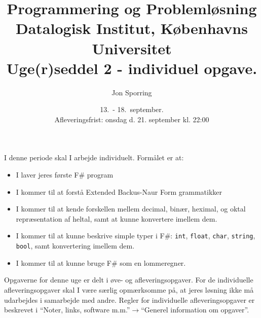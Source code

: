 \documentclass[a4paper,12pt]{article}
\title{Programmering og Problemløsning\\Datalogisk Institut,
  Københavns Universitet\\Uge(r)seddel 2 - individuel opgave.}
\author{Jon Sporring}
\date{13.\ - 18.\ september.\\Afleveringsfrist: onsdag d. 21. september kl. 22:00}
\begin{document}
\maketitle

I denne periode skal I arbejde individuelt. Formålet er at:
\begin{itemize}
\item I laver jeres første F\# program
\item I kommer til at forstå Extended Backus-Naur Form grammatikker
\item I kommer til at kende forskellen mellem decimal, binær, heximal, og oktal repræsentation af heltal, samt at kunne konvertere imellem dem.
\item I kommer til at kunne beskrive simple typer i F\#: \lstinline{int}, \lstinline{float}, \lstinline{char}, \lstinline{string}, \lstinline{bool}, samt konvertering imellem dem.
\item I kommer til at kunne bruge F\# som en lommeregner.
\end{itemize}

Opgaverne for denne uge er delt i øve- og afleveringsopgaver. For de individuelle afleveringsopgaver skal I være særlig opmærksomme på, at jeres løsning ikke må udarbejdes i samarbejde med andre. Regler for individuelle afleveringsopgaver er beskrevet i "`Noter, links, software m.m."'$\rightarrow$"`Generel information om opgaver"'.
\end{document}
